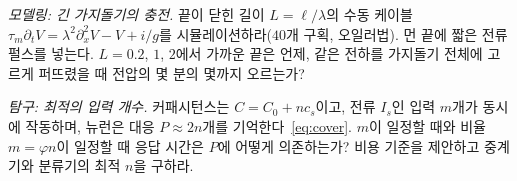 \begin{exercise}[\lvlB]
\label{ex:19:6}
\emph{모델링: 긴 가지돌기의 충전.} 끝이 닫힌 길이 $L=\ell/\lambda$의 수동 케이블 $\tau_m\partial_tV=\lambda^2\partial_x^2V-V+i/g$를 시뮬레이션하라($40$개 구획, 오일러법). 먼 끝에 짧은 전류 펄스를 넣는다. $L=0.2$, $1$, $2$에서 가까운 끝은 언제, 같은 전하를 가지돌기 전체에 고르게 퍼뜨렸을 때 전압의 몇 분의 몇까지 오르는가?
\end{exercise}

\begin{exercise}[\lvlC]
\label{ex:19:7}
\emph{탐구: 최적의 입력 개수.} 커패시턴스는 $C=C_0+nc_s$이고, 전류 $I_s$인 입력 $m$개가 동시에 작동하며, 뉴런은 대응 $P\approx2n$개를 기억한다~\eqref{eq:cover}. $m$이 일정할 때와 비율 $m=\varphi n$이 일정할 때 응답 시간은 $P$에 어떻게 의존하는가? 비용 기준을 제안하고 중계기와 분류기의 최적 $n$을 구하라.
\end{exercise}
